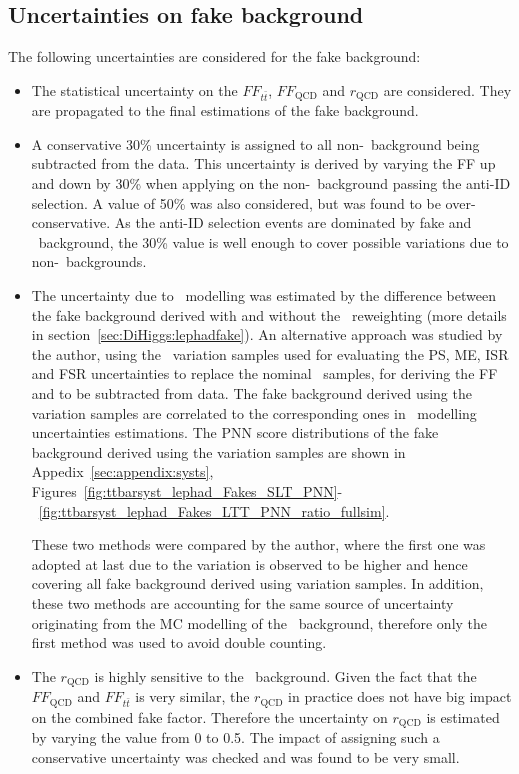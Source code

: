 \subsection{Uncertainties on fake background}
\label{sec:DiHiggs:fakesyst}
The following uncertainties are considered
for the fake background:
\begin{itemize}
  \item The statistical uncertainty on the $FF_{t\bar{t}}$, 
  $FF_\text{QCD}$ and $r_\text{QCD}$ are considered. They are
  propagated to the final estimations of the fake background.
  \item A conservative 30\% uncertainty is assigned to all non-\ttbar\
  background being subtracted from the data. This uncertainty is derived
  by varying the FF up and down by 30\% when applying on the non-\ttbar\ background
  passing the anti-ID selection. 
  A value of 50\% was also considered, but was found to be over-conservative.
  As the anti-ID selection events are dominated by fake and \ttbar\ background,
  the 30\% value is well enough to cover possible variations due to non-\ttbar\ backgrounds.  
  \item The uncertainty due to \ttbar\ modelling was estimated by the 
  difference between the fake background derived with and without the 
  \ttbar\ reweighting (more details in section~\ref{sec:DiHiggs:lephadfake}).
  An alternative approach was studied by the author, using the \ttbar\ variation samples
  used for evaluating the PS, ME, ISR and FSR uncertainties to replace the nominal \ttbar\ 
  samples, for deriving the FF and to be subtracted from data. The fake background derived
  using the variation samples are correlated to the corresponding ones in \ttbar\ modelling 
  uncertainties estimations. 
  The PNN score distributions of the fake background derived using the variation samples 
  are shown in Appedix~\ref{sec:appendix:systs}, Figures~\ref{fig:ttbarsyst_lephad_Fakes_SLT_PNN}-~\ref{fig:ttbarsyst_lephad_Fakes_LTT_PNN_ratio_fullsim}.
  
  These two methods were compared by the author, where the first one was adopted at last
  due to the variation is observed to be higher and hence covering all fake background derived
  using variation samples. In addition, these two methods are accounting for the same source
  of uncertainty originating from the MC modelling of the \ttbar\ background, therefore
  only the first method was used to avoid double counting. 
  \item  The $r_\text{QCD}$ is highly sensitive to the \ttbar\ background. 
  Given the fact that the $FF_\text{QCD}$ and $FF_{t\bar{t}}$ is very similar, 
  the $r_\text{QCD}$ in practice does not have big impact on the combined fake factor. 
  Therefore the uncertainty on $r_\text{QCD}$ is estimated by varying the value from 0 to 0.5. 
  The impact of assigning such a conservative uncertainty was checked and was found to be
  very small. 
   
\end{itemize}
